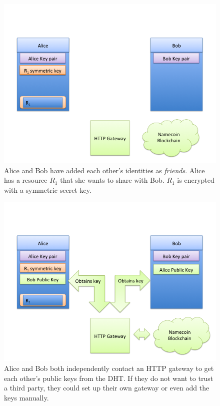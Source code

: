 \begin{figure}[h]
\centering
\includegraphics[width=\textwidth,height=0.2\paperheight,keepaspectratio
]{slides/Slide1.png}
\caption{Alice and Bob have added each other's identities as \emph{friends}. Alice has a resource $R_1$ that she wants to share with Bob. $R_1$ is encrypted with a symmetric secret key.}
\label{fig:slide1}
\end{figure}
\begin{figure}[h]
\centering
\includegraphics[width=\textwidth,height=0.2\paperheight,keepaspectratio
]{slides/Slide2.png}
\caption{Alice and Bob both independently contact an HTTP gateway to get each other's public keys from the DHT. If they do not want to trust a third party, they could set up their own gateway or even add the keys manually.}
\label{fig:slide2}
\end{figure}
